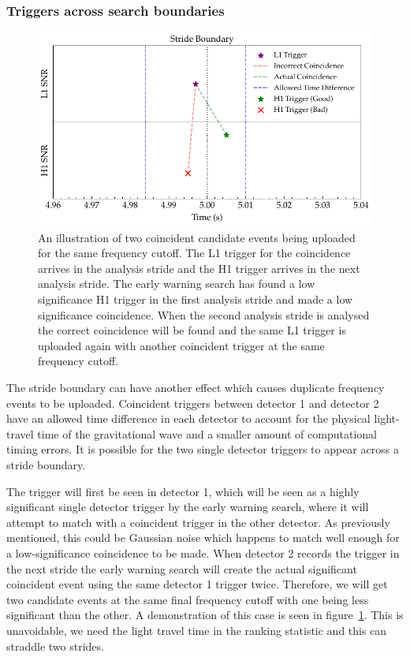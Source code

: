 \subsubsection{\label{6:sec:trigs-across-bounds}Triggers across search boundaries}
%
\begin{figure}
       \centering
    \includegraphics[width=\textwidth]{images/6_earlywarning/identified-problems/trigs_across_bounds.pdf}
    \caption{An illustration of two coincident candidate events being uploaded for the same frequency cutoff. The L1 trigger for the coincidence arrives in the analysis stride and the H1 trigger arrives in the next analysis stride. The early warning search has found a low significance H1 trigger in the first analysis stride and made a low significance coincidence. When the second analysis stride is analysed the correct coincidence will be found and the same L1 trigger is uploaded again with another coincident trigger at the same frequency cutoff.}
    \label{6:fig:triggers_across_boundaries}
\end{figure}
%
The stride boundary can have another effect which causes duplicate frequency events to be uploaded. Coincident triggers between detector 1 and detector 2 have an allowed time difference in each detector to account for the physical light-travel time of the gravitational wave and a smaller amount of computational timing errors. It is possible for the two single detector triggers to appear across a stride boundary.

The trigger will first be seen in detector 1, which will be seen as a highly significant single detector trigger by the early warning search, where it will attempt to match with a coincident trigger in the other detector. As previously mentioned, this could be Gaussian noise which happens to match well enough for a low-significance coincidence to be made. When detector 2 records the trigger in the next stride the early warning search will create the actual significant coincident event using the same detector 1 trigger twice. Therefore, we will get two candidate events at the same final frequency cutoff with one being less significant than the other. A demonstration of this case is seen in figure~\ref{6:fig:triggers_across_boundaries}. This is unavoidable, we need the light travel time in the ranking statistic and this can straddle two strides.

